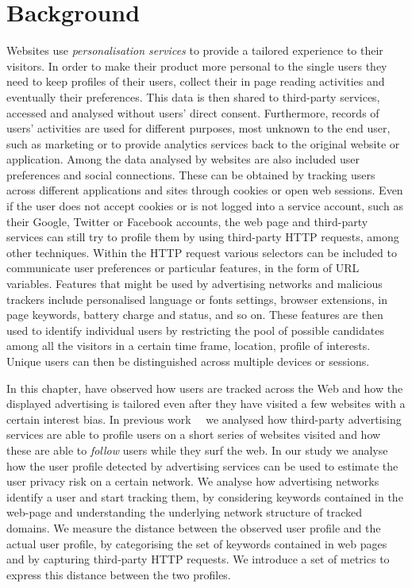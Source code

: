 \section{Background}
\noindent
Websites use \emph{personalisation services} to provide a tailored experience to their visitors. In order to make their product more personal to the single users they need to keep profiles of their users, collect their in page reading activities and eventually their preferences. This data is then shared to third-party services, accessed and analysed without users' direct consent. Furthermore, records of users' activities are used for different purposes, most unknown to the end user, such as marketing or to provide analytics services back to the original website or application.
Among the data analysed by websites are also included user preferences and social connections. These can be obtained by tracking users across different applications and sites through cookies or open web sessions. Even if the user does not accept cookies or is not logged into a service account, such as their Google, Twitter or Facebook accounts, the web page and third-party services can still try to profile them by using third-party HTTP requests, among other techniques. Within the HTTP request various selectors can be included to communicate user preferences or particular features, in the form of URL variables. Features that might be used by advertising networks and malicious trackers include personalised language or fonts settings, browser extensions, in page keywords, battery charge and status, and so on. These features are then used to identify individual users by restricting the pool of possible candidates among all the visitors in a certain time frame, location, profile of interests. Unique users can then be distinguished across multiple devices or sessions.

In this chapter, have observed how users are tracked across the Web and how the displayed advertising is tailored even after they have visited a few websites with a certain interest bias. In previous work~\cite{puglisi2016web}~\cite{puglisi2015you} we analysed how third-party advertising services are able to profile users on a short series of websites visited and how these are able to \emph{follow} users while they surf the web.
In our study we analyse how the user profile detected by advertising services can be used to estimate the user privacy risk on a certain network. We analyse how advertising networks identify a user and start tracking them, by considering keywords contained in the web-page and understanding the underlying network structure of tracked domains. We measure the distance between the observed user profile and the actual user profile, by categorising the set of keywords contained in web pages and by capturing third-party HTTP requests. We introduce a set of metrics to express this distance between the two profiles.

